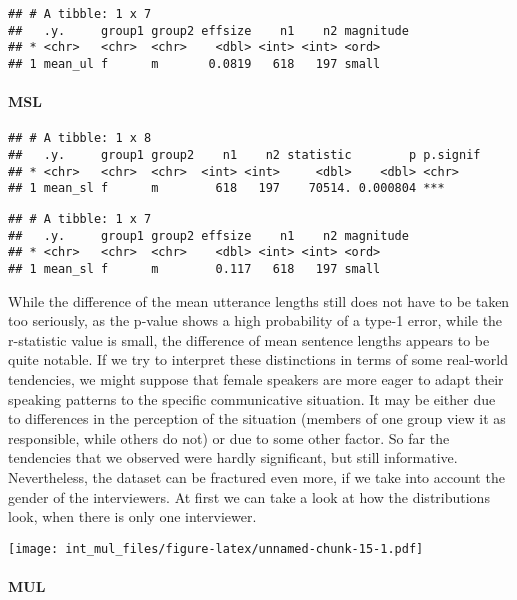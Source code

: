 \documentclass[
]{article}
\begin{document}
\begin{verbatim}
## # A tibble: 1 x 7
##   .y.     group1 group2 effsize    n1    n2 magnitude
## * <chr>   <chr>  <chr>    <dbl> <int> <int> <ord>    
## 1 mean_ul f      m       0.0819   618   197 small
\end{verbatim}

\hypertarget{msl-1}{%
\paragraph{MSL}\label{msl-1}}

\begin{verbatim}
## # A tibble: 1 x 8
##   .y.     group1 group2    n1    n2 statistic        p p.signif
## * <chr>   <chr>  <chr>  <int> <int>     <dbl>    <dbl> <chr>   
## 1 mean_sl f      m        618   197    70514. 0.000804 ***
\end{verbatim}

\begin{verbatim}
## # A tibble: 1 x 7
##   .y.     group1 group2 effsize    n1    n2 magnitude
## * <chr>   <chr>  <chr>    <dbl> <int> <int> <ord>    
## 1 mean_sl f      m        0.117   618   197 small
\end{verbatim}

While the difference of the mean utterance lengths still does not have
to be taken too seriously, as the p-value shows a high probability of a
type-1 error, while the r-statistic value is small, the difference of
mean sentence lengths appears to be quite notable. If we try to
interpret these distinctions in terms of some real-world tendencies, we
might suppose that female speakers are more eager to adapt their
speaking patterns to the specific communicative situation. It may be
either due to differences in the perception of the situation (members of
one group view it as responsible, while others do not) or due to some
other factor. So far the tendencies that we observed were hardly
significant, but still informative. Nevertheless, the dataset can be
fractured even more, if we take into account the gender of the
interviewers. At first we can take a look at how the distributions look,
when there is only one interviewer.

\texttt{[image: int\_mul\_files/figure-latex/unnamed-chunk-15-1.pdf]}

\hypertarget{mul-2}{%
\paragraph{MUL}\label{mul-2}}
\end{document}
